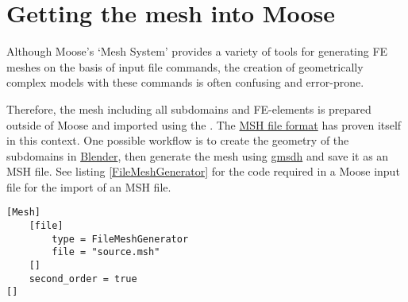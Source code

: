 \section{Getting the mesh into Moose}
\label{geometry-getting-the-mesh-into-moose}

Although Moose's ‘Mesh System’ provides a variety of tools for generating FE
meshes on the basis of input file commands, the creation of geometrically
complex models with these commands is often confusing and error-prone.

Therefore, the mesh including all subdomains and FE-elements is prepared
outside of Moose and imported using the . The
\href{https://gmsh.info/doc/texinfo/gmsh.html#MSH-file-format}{MSH file format}
has proven itself in this context. One possible workflow is to create the
geometry of the subdomains in \href{https://blender.org}{Blender}, then
generate the mesh using \href{https://gmsh.info/}{gmsdh} and save it as an MSH
file. See listing \ref{FileMeshGenerator} for the code required in a Moose
input file for the import of an MSH file.

\begin{lstlisting}[caption={Read mesh from a file},label={FileMeshGenerator}]
[Mesh]
    [file]
        type = FileMeshGenerator
        file = "source.msh"
    []
    second_order = true
[]
\end{lstlisting}



